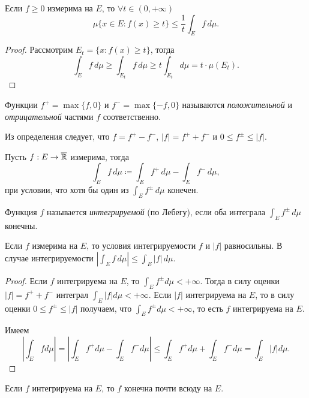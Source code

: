 \begin{theorem}
    Если $f \ge 0$ измерима на $E$, то $\forall t \in (0, +\infty)$
    \[
        \mu\{x \in E : f(x) \ge t\} \le \frac{1}{t} \int_E f \, d\mu.
    \]

    \begin{proof}
        Рассмотрим $E_t = \{x : f(x) \ge t\}$, тогда
        \[
            \int_E f \, d\mu \ge \int_{E_t} f \, d\mu \ge t\int_{E_t} d\mu = t \cdot \mu(E_t).
        \]
    \end{proof}
\end{theorem}

\begin{definition}
    Функции $f^{+} = \max\{f, 0\}$ и $f^{-} = \max\{-f, 0\}$ называются \textit{положительной} и \textit{отрицательной} частями $f$ соответственно.
\end{definition}

\begin{note}
    Из определения следует, что $f = f^{+} - f^{-}$, $|f| = f^{+} + f^{-}$ и $0 \leq f^{\pm} \leq |f|$.
\end{note}

\begin{definition}
    Пусть $f : E \rightarrow \overline{\mathbb{R}}$ измерима, тогда
    \[
        \int_E f \, d\mu \coloneqq \int_E f^+ \, d\mu - \int_E f^- \, d\mu,
    \]
    при условии, что хотя бы один из $\int_E f^\pm \, d\mu$ конечен.

    Функция $f$ называется \emph{интегрируемой} (по Лебегу), если оба интеграла $\int_E f^\pm \, d\mu$ конечны.
\end{definition}

\begin{note}
    Если $f$ измерима на $E$, то условия интегрируемости $f$ и $|f|$ равносильны. В случае интегрируемости $\left|\int_E f \, d\mu\right| \le \int_E |f| \, d\mu$.
\end{note}

\begin{proof}
    Если $f$ интегрируема на $E$, то $\int_{E}f^{\pm} d\mu < +\infty$. Тогда в силу оценки $|f| = f^{+} + f^{-}$ интеграл $\int_{E}|f| d\mu < +\infty$. Если $|f|$ интегрируема на $E$, то в силу оценки $0 \leq f^{\pm} \leq |f|$ получаем, что $\int_{E}f^{\pm} d\mu < +\infty$, то есть $f$ интегрируема на $E$. 
    
    Имеем
    \[\left|\int_{E}f d\mu\right| = \left|\int_{E}f^{+} d\mu - \int_{E}f^{-} d\mu\right| \leq \int_{E}f^{+} d\mu + \int_{E}f^{-} d\mu = \int_{E}|f| d\mu.\]
\end{proof}
\begin{note}
    Если $f$ интегрируема на $E$, то $f$ конечна почти всюду на $E$.
\end{note}


